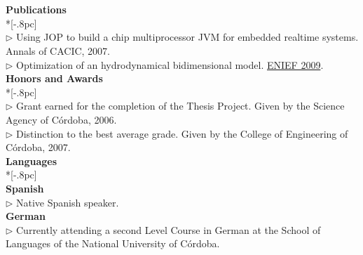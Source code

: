 \documentclass[a4paper,11pt,english]{article}
\begin{document}
\\\\
{\bf Publications} \\*[-.8pc]
\underline{\hspace{6in}} \\
$\triangleright$ Using JOP to build a chip multiprocessor JVM for embedded realtime systems. Annals of CACIC, 2007.\\
$\triangleright$ Optimization of an hydrodynamical bidimensional model. \href{http://enief2009.pladema.net/index.html}{ENIEF 2009}. \\


{\bf Honors and Awards} \\*[-.8pc]
\underline{\hspace{6in}} \\
$\triangleright$ Grant earned for the completion of the Thesis Project.
Given by the Science Agency of C\'ordoba, 2006.\\ 
$\triangleright$ Distinction to the best average grade.
Given by the College of Engineering of C\'ordoba, 2007.\\

{\large \bf Languages} \\*[-.8pc]
\underline{\hspace{6in}} \\

{\bf Spanish}\\
$\triangleright$ Native Spanish speaker.
\\

{\bf German}\\
$\triangleright$ Currently attending a second Level Course in German 
at the School of Languages of the National University of C\'ordoba.
 \\
\end{document}
